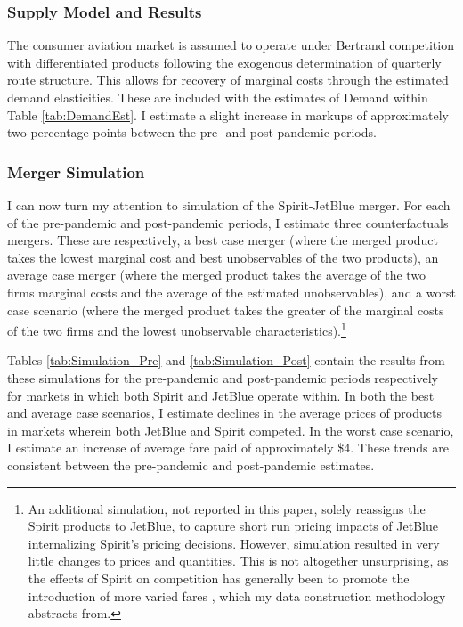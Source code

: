 \documentclass{article}
\begin{document}
	\subsubsection{Supply Model and Results}
	\label{sec:Analysis_Supply}
	The consumer aviation market is assumed to operate under Bertrand competition with differentiated products following the exogenous determination of quarterly route structure. This allows for recovery of marginal costs through the estimated demand elasticities.  These are included with the estimates of Demand within Table \ref{tab:DemandEst}. I estimate a slight increase in markups of approximately two percentage points between the pre- and post-pandemic periods. 
	
	
	\subsubsection{Merger Simulation}
	\label{sec:Analysis_Merger}
	I can now turn my attention to simulation of the Spirit-JetBlue merger. For each of the pre-pandemic and post-pandemic periods, I estimate three counterfactuals mergers. These are respectively, a best case merger (where the merged product takes the lowest marginal cost and best unobservables of the two products), an average case merger (where the merged product takes the average of the two firms marginal costs and the average of the estimated unobservables), and a worst case scenario (where the merged product takes the greater of the marginal costs of the two firms and the lowest unobservable characteristics).\footnote{An additional simulation, not reported in this paper, solely reassigns the Spirit products to JetBlue, to capture short run pricing impacts of JetBlue internalizing Spirit's pricing decisions. However, simulation resulted in very little changes to prices and quantities. This is not altogether unsurprising, as the effects of Spirit on competition has generally been to promote the introduction of more varied fares \citep{shrago_spirit_2024}, which my data construction methodology abstracts from.}
	 
	 Tables \ref{tab:Simulation_Pre} and \ref{tab:Simulation_Post} contain the results from these simulations for the pre-pandemic and post-pandemic periods respectively for markets in which both Spirit and JetBlue operate within. In both the best and average case scenarios, I estimate declines in the average prices of products in markets wherein both JetBlue and Spirit competed. In the worst case scenario, I estimate an increase of average fare paid of approximately \$4. These trends are consistent between the pre-pandemic and post-pandemic estimates. 
\end{document}
